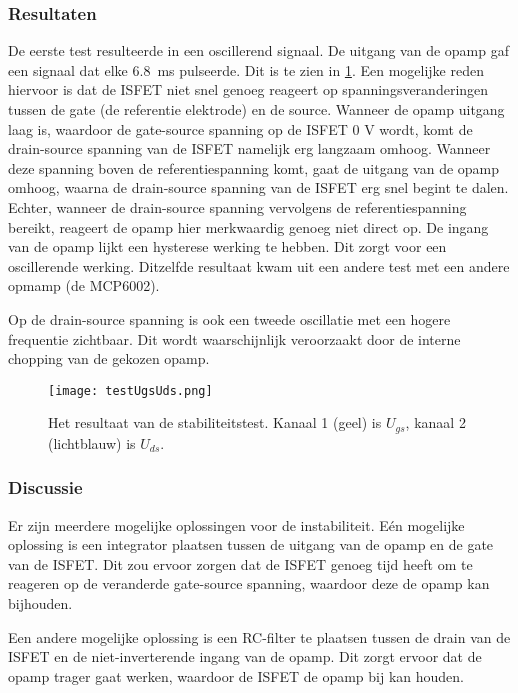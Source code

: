 \subsubsection{Resultaten} \label{sec:stabilityTestResults}

De eerste test resulteerde in een oscillerend signaal. De uitgang van de opamp gaf een signaal dat elke \qty{6.8}{\milli\second} pulseerde. Dit is te zien in \cref{fig:resultUgsUds}.
Een mogelijke reden hiervoor is dat de ISFET niet snel genoeg reageert op spanningsveranderingen tussen de gate (de referentie elektrode) en de source. Wanneer de opamp uitgang laag is, waardoor de gate-source spanning op de ISFET 0 V wordt, komt de drain-source spanning van de ISFET namelijk erg langzaam omhoog. Wanneer deze spanning boven de referentiespanning komt, gaat de uitgang van de opamp omhoog, waarna de drain-source spanning van de ISFET erg snel begint te dalen. Echter, wanneer de drain-source spanning vervolgens de referentiespanning bereikt, reageert de opamp hier merkwaardig genoeg niet direct op. De ingang van de opamp lijkt een hysterese werking te hebben. Dit zorgt voor een oscillerende werking. Ditzelfde resultaat kwam uit een andere test met een andere opmamp (de MCP6002).

Op de drain-source spanning is ook een tweede oscillatie met een hogere frequentie zichtbaar. Dit wordt waarschijnlijk veroorzaakt door de interne chopping van de gekozen opamp.


\begin{figure}[ht]
    \centering
    \def\svgwidth{0.75\textwidth}
    \texttt{[image: testUgsUds.png]}
    \caption{Het resultaat van de stabiliteitstest. Kanaal 1 (geel) is $U_{gs}$, kanaal 2 (lichtblauw) is $U_{ds}$.}
    \label{fig:resultUgsUds}
\end{figure}


\subsubsection{Discussie}
Er zijn meerdere mogelijke oplossingen voor de instabiliteit.
Eén mogelijke oplossing is een integrator plaatsen tussen de uitgang van de opamp en de gate van de ISFET. Dit zou ervoor zorgen dat de ISFET genoeg tijd heeft om te reageren op de veranderde gate-source spanning, waardoor deze de opamp kan bijhouden.

Een andere mogelijke oplossing is een RC-filter te plaatsen tussen de drain van de ISFET en de niet-inverterende ingang van de opamp. Dit zorgt ervoor dat de opamp trager gaat werken, waardoor de ISFET de opamp bij kan houden.

